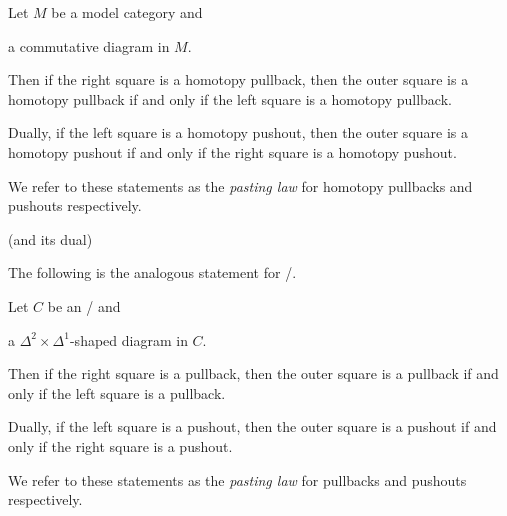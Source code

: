 \begin{prop}\label{prop:pastingLaw}
    Let $M$ be a model category and 
    \begin{center}
    \end{center}
    a commutative diagram in $M$.

    Then if the right square is a homotopy pullback, then the outer square is a homotopy pullback if and only if the left square is a homotopy pullback.

    Dually, if the left square is a homotopy pushout, then the outer square is a homotopy pushout if and only if the right square is a homotopy pushout.

    We refer to these statements as the \emph{pasting law} for homotopy pullbacks and pushouts respectively.
    \begin{reference}
        \cite[Proposition 8]{models_of_htpy_limits} (and its dual)
    \end{reference}
\end{prop}
The following is the analogous statement for \inftycats/.
\begin{prop}
    Let $C$ be an \inftycat/ and 
    \begin{center}
    \end{center}
    a $\Delta^2\times\Delta^1$-shaped diagram in $C$.

    Then if the right square is a pullback, then the outer square is a pullback if and only if the left square is a pullback.

    Dually, if the left square is a pushout, then the outer square is a pushout if and only if the right square is a pushout.

    We refer to these statements as the \emph{pasting law} for pullbacks and pushouts respectively.
    \begin{reference}
        \cite[Proposition 7.6.3.16]{kerodon}
    \end{reference}
\end{prop}
